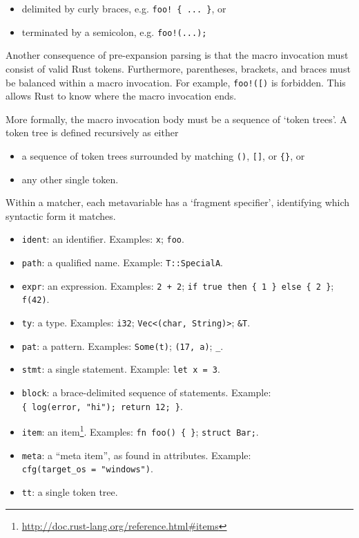 \documentclass[a4paper,]{book}
\renewcommand{\href}[2]{#2\footnote{\url{#1}}}
\providecommand{\tightlist}{%
  \setlength{\itemsep}{0pt}\setlength{\parskip}{0pt}}
\begin{document}
\begin{itemize}
\tightlist
\item
  delimited by curly braces, e.g. \texttt{foo!\ \{\ ...\ \}}, or
\item
  terminated by a semicolon, e.g. \texttt{foo!(...);}
\end{itemize}

Another consequence of pre-expansion parsing is that the macro
invocation must consist of valid Rust tokens. Furthermore, parentheses,
brackets, and braces must be balanced within a macro invocation. For
example, \texttt{foo!({[})} is forbidden. This allows Rust to know where
the macro invocation ends.

More formally, the macro invocation body must be a sequence of `token
trees'. A token tree is defined recursively as either

\begin{itemize}
\tightlist
\item
  a sequence of token trees surrounded by matching \texttt{()},
  \texttt{{[}{]}}, or \texttt{\{\}}, or
\item
  any other single token.
\end{itemize}

Within a matcher, each metavariable has a `fragment specifier',
identifying which syntactic form it matches.

\begin{itemize}
\tightlist
\item
  \texttt{ident}: an identifier. Examples: \texttt{x}; \texttt{foo}.
\item
  \texttt{path}: a qualified name. Example: \texttt{T::SpecialA}.
\item
  \texttt{expr}: an expression. Examples: \texttt{2\ +\ 2};
  \texttt{if\ true\ then\ \{\ 1\ \}\ else\ \{\ 2\ \}}; \texttt{f(42)}.
\item
  \texttt{ty}: a type. Examples: \texttt{i32};
  \texttt{Vec\textless{}(char,\ String)\textgreater{}}; \texttt{\&T}.
\item
  \texttt{pat}: a pattern. Examples: \texttt{Some(t)};
  \texttt{(17,\ \textquotesingle{}a\textquotesingle{})}; \texttt{\_}.
\item
  \texttt{stmt}: a single statement. Example: \texttt{let\ x\ =\ 3}.
\item
  \texttt{block}: a brace-delimited sequence of statements. Example:
  \texttt{\{\ log(error,\ "hi");\ return\ 12;\ \}}.
\item
  \texttt{item}: an
  \href{http://doc.rust-lang.org/reference.html\#items}{item}. Examples:
  \texttt{fn\ foo()\ \{\ \}}; \texttt{struct\ Bar;}.
\item
  \texttt{meta}: a ``meta item'', as found in attributes. Example:
  \texttt{cfg(target\_os\ =\ "windows")}.
\item
  \texttt{tt}: a single token tree.
\end{itemize}
\end{document}
